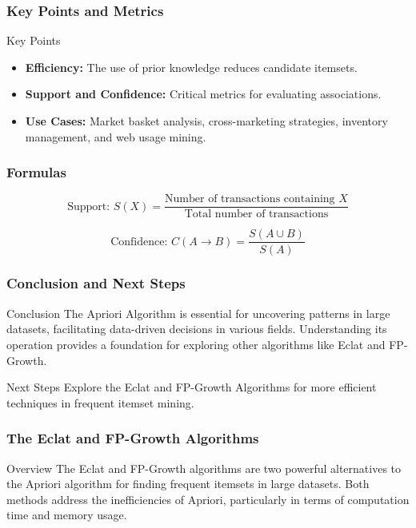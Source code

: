 \documentclass{beamer}
\begin{document}
\begin{frame}[fragile]
    \frametitle{Key Points and Metrics}
    \begin{block}{Key Points}
        \begin{itemize}
            \item \textbf{Efficiency:} The use of prior knowledge reduces candidate itemsets.
            \item \textbf{Support and Confidence:} Critical metrics for evaluating associations.
            \item \textbf{Use Cases:} Market basket analysis, cross-marketing strategies, inventory management, and web usage mining.
        \end{itemize}
    \end{block}
\end{frame}

\begin{frame}[fragile]
    \frametitle{Formulas}
    \begin{equation}
        \text{Support: } S(X) = \frac{\text{Number of transactions containing } X}{\text{Total number of transactions}}
    \end{equation}
    
    \begin{equation}
        \text{Confidence: } C(A \rightarrow B) = \frac{S(A \cup B)}{S(A)}
    \end{equation}
\end{frame}

\begin{frame}[fragile]
    \frametitle{Conclusion and Next Steps}
    \begin{block}{Conclusion}
        The Apriori Algorithm is essential for uncovering patterns in large datasets, facilitating data-driven decisions in various fields. Understanding its operation provides a foundation for exploring other algorithms like Eclat and FP-Growth.
    \end{block}

    \begin{block}{Next Steps}
        Explore the Eclat and FP-Growth Algorithms for more efficient techniques in frequent itemset mining.
    \end{block}
\end{frame}

\begin{frame}[fragile]
    \frametitle{The Eclat and FP-Growth Algorithms}
    \begin{block}{Overview}
        The Eclat and FP-Growth algorithms are two powerful alternatives to the Apriori algorithm for finding frequent itemsets in large datasets. 
        Both methods address the inefficiencies of Apriori, particularly in terms of computation time and memory usage.
    \end{block}
\end{frame}
\end{document}
